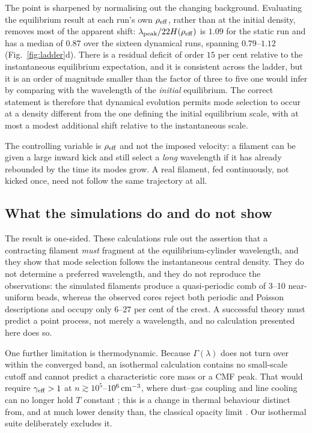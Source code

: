 \documentclass[usenatbib,twoside,twocolumn]{mnras}
\begin{document}
The point is sharpened by normalising out the changing background. Evaluating the equilibrium result at each run's own $\rho_{\rm eff}$, rather than at the initial density, removes most of the apparent shift: $\lambda_{\rm peak}/22H(\rho_{\rm eff})$ is $1.09$ for the static run and has a median of $0.87$ over the sixteen dynamical runs, spanning $0.79$--$1.12$ (Fig.~\ref{fig:ladder}d). There is a residual deficit of order $15$ per cent relative to the instantaneous equilibrium expectation, and it is consistent across the ladder, but it is an order of magnitude smaller than the factor of three to five one would infer by comparing with the wavelength of the \emph{initial} equilibrium. The correct statement is therefore that dynamical evolution permits mode selection to occur at a density different from the one defining the initial equilibrium scale, with at most a modest additional shift relative to the instantaneous scale.

The controlling variable is $\rho_{\rm eff}$ and not the imposed velocity: a filament can be given a large inward kick and still select a \emph{long} wavelength if it has already rebounded by the time its modes grow. A real filament, fed continuously, not kicked once, need not follow the same trajectory at all.

\subsection{What the simulations do and do not show}
\label{sec:simsummary}

The result is one-sided. These calculations rule out the assertion that a contracting filament \emph{must} fragment at the equilibrium-cylinder wavelength, and they show that mode selection follows the instantaneous central density. They do not determine a preferred wavelength, and they do not reproduce the observations: the simulated filaments produce a quasi-periodic comb of 3--10 near-uniform beads, whereas the observed cores reject both periodic and Poisson descriptions and occupy only $6$--$27$ per cent of the crest. A successful theory must predict a point process, not merely a wavelength, and no calculation presented here does so.

One further limitation is thermodynamic. Because $\Gamma(\lambda)$ does not turn over within the converged band, an isothermal calculation contains no small-scale cutoff and cannot predict a characteristic core mass or a CMF peak. That would require $\gamma_{\rm eff}>1$ at $n\gtrsim10^{5}$--$10^{6}\,{\rm cm^{-3}}$, where dust--gas coupling and line cooling can no longer hold $T$ constant \citep{Larson1985,Glover2012}; this is a change in thermal behaviour distinct from, and at much lower density than, the classical opacity limit \citep{Rees1976,LowLyndenBell1976}. Our isothermal suite deliberately excludes it.
\end{document}
